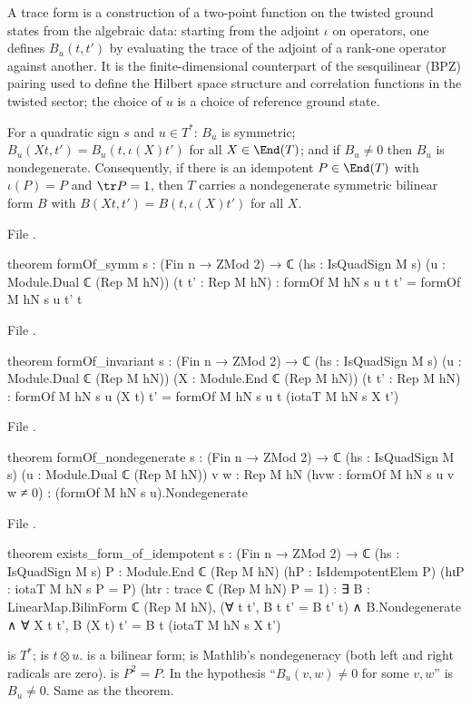 \begin{physics}
A trace form is a construction of a two-point function on the twisted ground states from the algebraic data: starting from the adjoint $\iota$ on operators, one defines $B_u(t,t')$ by evaluating the trace of the adjoint of a rank-one operator against another. It is the finite-dimensional counterpart of the sesquilinear (BPZ) pairing used to define the Hilbert space structure and correlation functions in the twisted sector; the choice of $u$ is a choice of reference ground state.
\end{physics}
\begin{theorem}\label{ch06:thm:formOf}
For a quadratic sign $s$ and $u\in T^*$: $B_u$ is symmetric; $B_u(Xt,t')=B_u(t,\iota(X)t')$ for all
$X\in\End(T)$; and if $B_u\ne0$ then $B_u$ is nondegenerate.  Consequently, if there is an
idempotent $P\in\End(T)$ with $\iota(P)=P$ and $\tr P=1$, then $T$ carries a nondegenerate symmetric
bilinear form $B$ with $B(Xt,t')=B(t,\iota(X)t')$ for all $X$.
\end{theorem}
\noindent File .
\begin{leancode}
theorem formOf_symm {s : (Fin n → ZMod 2) → ℂ} (hs : IsQuadSign M s)
    (u : Module.Dual ℂ (Rep M hN)) (t t' : Rep M hN) :
    formOf M hN s u t t' = formOf M hN s u t' t
\end{leancode}
\noindent File .
\begin{leancode}
theorem formOf_invariant {s : (Fin n → ZMod 2) → ℂ} (hs : IsQuadSign M s)
    (u : Module.Dual ℂ (Rep M hN)) (X : Module.End ℂ (Rep M hN)) (t t' : Rep M hN) :
    formOf M hN s u (X t) t' = formOf M hN s u t (iotaT M hN s X t')
\end{leancode}
\noindent File .
\begin{leancode}
theorem formOf_nondegenerate {s : (Fin n → ZMod 2) → ℂ} (hs : IsQuadSign M s)
    (u : Module.Dual ℂ (Rep M hN)) {v w : Rep M hN} (hvw : formOf M hN s u v w ≠ 0) :
    (formOf M hN s u).Nondegenerate
\end{leancode}
\noindent File .
\begin{leancode}
theorem exists_form_of_idempotent {s : (Fin n → ZMod 2) → ℂ} (hs : IsQuadSign M s)
    {P : Module.End ℂ (Rep M hN)} (hP : IsIdempotentElem P) (hιP : iotaT M hN s P = P)
    (htr : trace ℂ (Rep M hN) P = 1) :
    ∃ B : LinearMap.BilinForm ℂ (Rep M hN), (∀ t t', B t t' = B t' t) ∧ B.Nondegenerate ∧
      ∀ X t t', B (X t) t' = B t (iotaT M hN s X t')
\end{leancode}
\begin{dictionary}
 is $T^*$;  is $t\otimes u$.  
is a bilinear form;  is Mathlib's nondegeneracy (both left and right
radicals are zero).   is $P^2=P$.  In  the
hypothesis ``$B_u(v,w)\ne0$ for some $v,w$'' is $B_u\ne0$.  Same as the theorem.
\end{dictionary}

